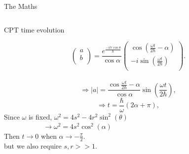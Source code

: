 \documentclass[10pt]{beamer}
\begin{document}
\begin{frame}{The Maths}
\begin{columns}
    \pause
    \begin{column}{0.5\textwidth}
    \vspace{2cm}
    \textcolor{myNewColorC}{CPT} time evolution\\
    \vspace{-1cm}
    \begin{scriptsize}
    \begin{equation*}
        \begin{pmatrix}
                a \\
                b \\                
        \end{pmatrix} = \frac{e^{\frac{-itr \cos\theta}{\hbar}}}{\cos{\alpha}}
        \begin{pmatrix}
                \cos(\frac{\omega t}{2 \hbar} - \alpha)\\
                - i \sin(\frac{\omega t}{2\hbar})\\
        \end{pmatrix}.
    \end{equation*}\\
    \pause
    \begin{equation*}
    \Rightarrow |a|= \frac{\cos{\frac{\omega t}{2 \hbar} -\alpha}}{\cos{\alpha}} \sin\left(\frac{\omega t}{2\hbar}\right),
    \end{equation*}
    \pause
    \begin{equation*}
    \Rightarrow t = \frac{\hbar}{\omega}(2 \alpha + \pi) ,
    \end{equation*}
    \pause
    Since $\omega$ is fixed,
    \textcolor{myNewColorD}{$\omega^2 = 4s^2 - 4r^2 \sin^{2}(\theta)$}\\
    $\quad\quad\quad\quad\:\:\:\quad \to \omega^2 = 4s^2\cos^2(\alpha)$\\
    \pause
    \vspace{0.5cm}
    Then $t \to 0$ when $\alpha \to -\frac{\pi}{2}$.\\
    but we also require $s, r >> 1$.\\
    \end{scriptsize}
    \end{column}
\end{columns}
\end{frame}
\end{document}
